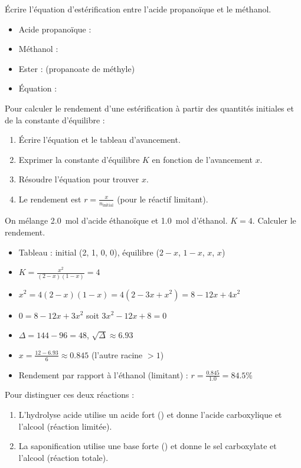 \begin{exemple}
Écrire l'équation d'estérification entre l'acide propanoïque et le méthanol.
\begin{itemize}
    \item Acide propanoïque : 
    \item Méthanol : 
    \item Ester :  (propanoate de méthyle)
    \item Équation : 
\end{itemize}
\end{exemple}

Pour calculer le rendement d'une estérification à partir des quantités initiales et de la constante d'équilibre :
\begin{enumerate}
    \item Écrire l'équation et le tableau d'avancement.
    \item Exprimer la constante d'équilibre $K$ en fonction de l'avancement $x$.
    \item Résoudre l'équation pour trouver $x$.
    \item Le rendement est $r = \frac{x}{n_{\text{initial}}}$ (pour le réactif limitant).
\end{enumerate}

\begin{exemple}
On mélange \SI{2.0}{\mol} d'acide éthanoïque et \SI{1.0}{\mol} d'éthanol. $K = 4$. Calculer le rendement.
\begin{itemize}
    \item Tableau : initial (2, 1, 0, 0), équilibre ($2-x$, $1-x$, $x$, $x$)
    \item $K = \frac{x^2}{(2-x)(1-x)} = 4$
    \item $x^2 = 4(2-x)(1-x) = 4(2 - 3x + x^2) = 8 - 12x + 4x^2$
    \item $0 = 8 - 12x + 3x^2$ soit $3x^2 - 12x + 8 = 0$
    \item $\Delta = 144 - 96 = 48$, $\sqrt{\Delta} \approx 6.93$
    \item $x = \frac{12 - 6.93}{6} \approx 0.845$ (l'autre racine $>1$)
    \item Rendement par rapport à l'éthanol (limitant) : $r = \frac{0.845}{1.0} = 84.5\%$
\end{itemize}
\end{exemple}

Pour distinguer ces deux réactions :
\begin{enumerate}
    \item L'hydrolyse acide utilise un acide fort () et donne l'acide carboxylique et l'alcool (réaction limitée).
    \item La saponification utilise une base forte () et donne le sel carboxylate et l'alcool (réaction totale).
\end{enumerate}

